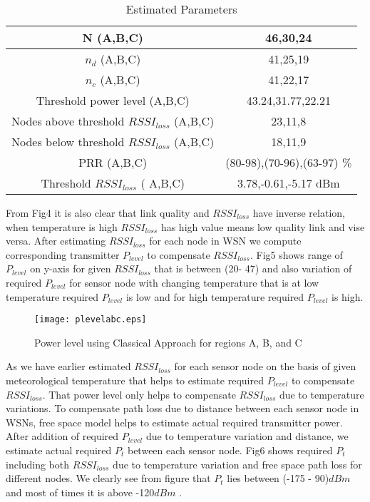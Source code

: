 \documentclass[12pt, conference, compsocconf, onecolumn, draftcls]{IEEEtran}
\begin{document}
\begin{table}[h!]
  \centering
  \caption{Estimated Parameters}
  \tiny
  \begin{tabular}{|c|c|}\hline
    N (A,B,C)   & 46,30,24 \\ \hline
    $n_{d}$  (A,B,C)   & 41,25,19 \\ \hline
    $n_{c}$ (A,B,C) & 41,22,17 \\ \hline
    Threshold power level (A,B,C)  & 43.24,31.77,22.21 \\ \hline
    Nodes above threshold $RSSI_{loss}$ (A,B,C)  & 23,11,8 \\ \hline
    Nodes below threshold $RSSI_{loss}$ (A,B,C)   & 18,11,9 \\ \hline
    PRR (A,B,C) & (80-98),(70-96),(63-97) $\%$ \\ \hline
    Threshold $RSSI_{loss}$ ( A,B,C) & 3.78,-0.61,-5.17 dBm \\\hline
    \end{tabular}\label{tab:addlabel}\end{table}
From Fig4 it is also clear that link quality and $RSSI_{loss}$ have inverse relation, when temperature is high $RSSI_{loss}$ has high value means low quality link and vise versa. After estimating $RSSI_{loss}$ for each node in WSN we compute corresponding transmitter $P_{level}$ to compensate $RSSI_{loss}$.  Fig5 shows range of $P_{level}$ on y-axis for given $RSSI_{loss}$ that is between (20- 47) and also variation of required $P_{level}$ for sensor node with changing temperature that is at low temperature required $P_{level}$ is low and for high temperature required $P_{level}$ is high.

\begin{figure}[h]
\begin{center}
\texttt{[image: plevelabc.eps]}
\caption{Power level using Classical Approach for regions A, B, and C}
\end{center}
\end{figure}

As we have earlier estimated $RSSI_{loss}$ for each sensor node on the basis of given meteorological temperature that helps to estimate required $P_{level}$ to compensate $RSSI_{loss}$. That power level only helps to compensate $RSSI_{loss}$ due to temperature variations. To compensate path loss due to distance  between each sensor node in WSNs, free space model helps to estimate actual required transmitter power. After addition of required $P_{level}$ due to temperature variation and distance, we estimate actual required $P_{t}$ between each sensor node. Fig6 shows required $P_{t}$  including both $RSSI_{loss}$ due to temperature variation and free space path loss for different nodes. We clearly see from figure that $P_{t}$ lies between (-175 - 90)$dBm$ and most of times it is above -120$dBm$ .
\end{document}

